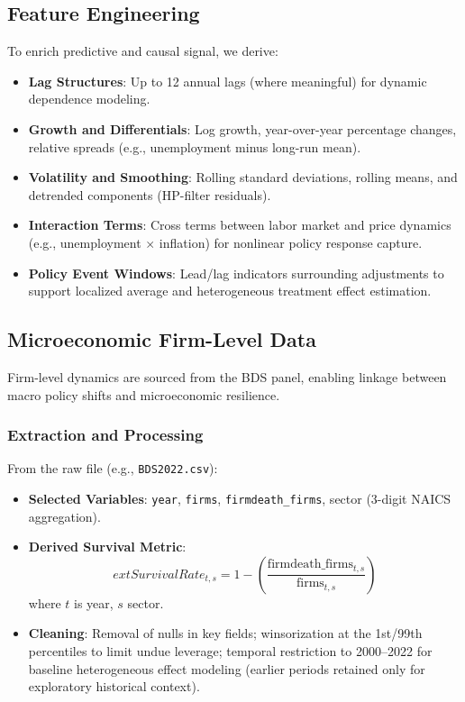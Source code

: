 \subsection{Feature Engineering}\label{subsec:feature_engineering}
To enrich predictive and causal signal, we derive:
\begin{itemize}
  \item \textbf{Lag Structures}: Up to 12 annual lags (where meaningful) for dynamic dependence modeling.
  \item \textbf{Growth and Differentials}: Log growth, year-over-year percentage changes, relative spreads (e.g., unemployment minus long-run mean).
  \item \textbf{Volatility and Smoothing}: Rolling standard deviations, rolling means, and detrended components (HP-filter residuals).
  \item \textbf{Interaction Terms}: Cross terms between labor market and price dynamics (e.g., unemployment $\times$ inflation) for nonlinear policy response capture.
  \item \textbf{Policy Event Windows}: Lead/lag indicators surrounding \VAT{} adjustments to support localized average and heterogeneous treatment effect estimation.
\end{itemize}

\subsection{Microeconomic Firm-Level Data}\label{subsec:firm_data}
Firm-level dynamics are sourced from the BDS panel, enabling linkage between macro policy shifts and microeconomic resilience.

\subsubsection{Extraction and Processing}\label{subsubsec:firm_processing}
From the raw file (e.g., \texttt{BDS2022.csv}):
\begin{itemize}
  \item \textbf{Selected Variables}: \texttt{year}, \texttt{firms}, \texttt{firmdeath\_firms}, sector (3-digit NAICS aggregation).
  \item \textbf{Derived Survival Metric}:
  \begin{equation}
  	ext{Survival Rate}_{t,s} = 1 - \left( \frac{\text{firmdeath\_firms}_{t,s}}{\text{firms}_{t,s}} \right)
  \end{equation}
  where $t$ is year, $s$ sector.
  \item \textbf{Cleaning}: Removal of nulls in key fields; winsorization at the 1st/99th percentiles to limit undue leverage; temporal restriction to 2000--2022 for baseline heterogeneous effect modeling (earlier periods retained only for exploratory historical context).
\end{itemize}

